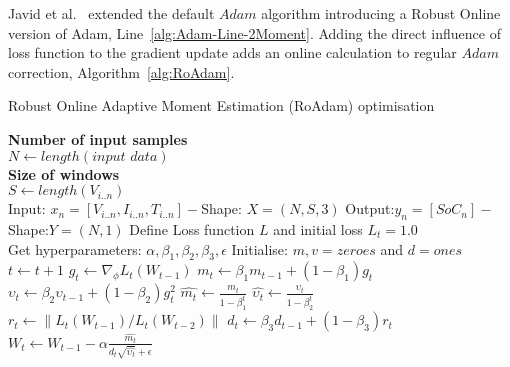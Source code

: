 %
%
Javid et al.~\cite{javid_adaptive_2020} extended the default $Adam$ algorithm introducing a Robust Online version of Adam, Line~\ref{alg:Adam-Line-2Moment}.
Adding the direct influence of loss function to the gradient update adds an online calculation to regular $Adam$ correction, \mbox{Algorithm~\ref{alg:RoAdam}}.
\begin{algorithm}
  \caption{Robust Online Adaptive Moment Estimation (RoAdam) optimisation}
  \begin{algorithmic}[1]
    \STATE \textbf{Number of input samples} \\ $N\gets length(\textit{input data})$\\
    \STATE \textbf{Size of windows} \\ $S\gets length(V_{i..n})$\\
    \STATE Input: $x_n = [V_{i..n}, I_{i..n}, T_{i..n}] - $Shape: $X = (N, S, 3)$
    \STATE Output:$y_n = [SoC_{n}] - $Shape:$Y = (N, 1)$
    \STATE Define Loss function $L$ and initial loss $L_t = 1.0$ \\
           Get hyperparameters: $\alpha, \beta_1, \beta_2, \beta_3, \epsilon$
    \STATE Initialise: $m,v=zeroes$ and $d=ones$ \\
    \STATE $t \gets t+1$
    \STATE $g_t \gets \nabla_\phi L_t (W_{t-1})$ 
    \STATE $m_t \gets \beta_1 m_{t-1}+(1-\beta_1) g_t $ 
    \STATE $\upsilon_t \gets \beta_2 \upsilon_{t-1}+ \left(1-\beta_2 \right)g^2_t $ 
    \STATE $\hat{m_t} \gets \frac{m_t}{1-\beta^t_1}$ 
    \STATE $\hat{\upsilon_t} \gets \frac{\upsilon_t}{1-\beta^t_2} $ 
    \STATE $r_t \gets \parallel L_t\left(W_{t-1}\right)/L_t\left(W_{t-2}\right) \parallel $ 
    \STATE $d_t \gets \beta_3 d_{t-1}+\left(1-\beta_3\right)r_t $ 
    \STATE $W_t \gets W_{t-1}- \alpha \frac{\hat{m_t}}{d_t\sqrt{\hat{\upsilon_t}}+\epsilon} $ 
    \ENDWHILE
  \end{algorithmic}
  \label{alg:RoAdam}
\end{algorithm}
